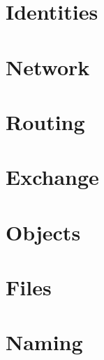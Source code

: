 \section{Identities}  
\section{Network}  
\section{Routing} 
\section{Exchange} 
\section{Objects}  
\section{Files}  
\section{Naming}  
